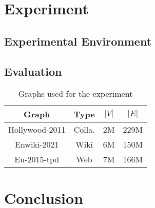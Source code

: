 \documentclass[acmsmall,nonacm,screen,review]{acmart}
\begin{document}
\section{Experiment}
\subsection{Experimental Environment}
\subsection{Evaluation}
\begin{table}[bt!]
\centering
\begin{tabular}{ cccc }
 \centering
 Graph & Type & $|V|$ & $|E|$  \\ 
 \hline
 Hollywood-2011 & Colla. & 2M & 229M \\ 
 Enwiki-2021 & Wiki & 6M & 150M \\ 
 Eu-2015-tpd & Web & 7M & 166M 

\end{tabular}
\label{graphs}
\caption{Graphs used for the experiment}
\end{table}
\section{Conclusion}



\end{document}
